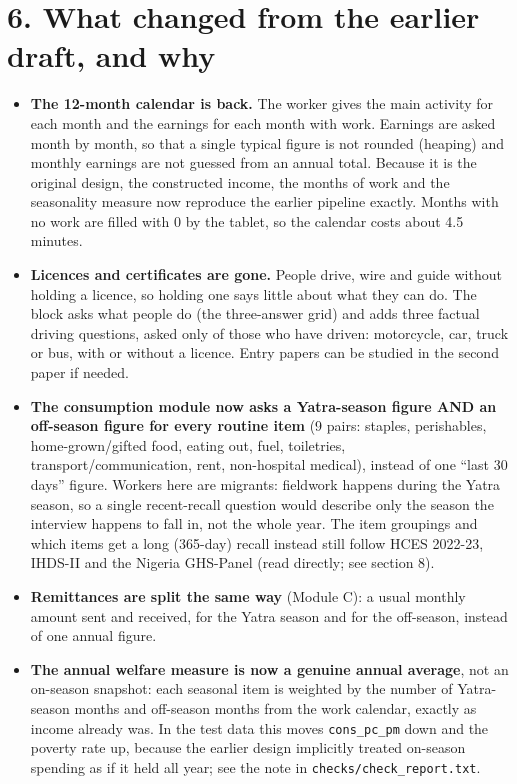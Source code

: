 \documentclass[10pt]{article}
\begin{document}
\section*{6. What changed from the earlier draft, and why}
\begin{itemize}[leftmargin=1.2em,itemsep=2pt]
\item \textbf{The 12-month calendar is back.} The worker gives the main activity for each month and the earnings for each month with work. Earnings are asked month by month, so that a single typical figure is not rounded (heaping) and monthly earnings are not guessed from an annual total.
Because it is the original design, the constructed income, the months of work and the seasonality measure now reproduce the earlier pipeline exactly. Months with no work are filled with 0 by the tablet, so the calendar costs about 4.5 minutes.
\item \textbf{Licences and certificates are gone.} People drive, wire and guide without holding a licence, so holding one says little about what they can do. The block asks what people do (the three-answer grid) and adds three factual driving questions, asked only of those who have driven: motorcycle, car, truck or bus, with or without a licence. Entry papers can be studied in the second paper if needed.
\item \textbf{The consumption module now asks a Yatra-season figure AND an off-season figure for every routine item} (9 pairs: staples, perishables, home-grown/gifted food, eating out, fuel, toiletries, transport/communication, rent, non-hospital medical), instead of one ``last 30 days'' figure. Workers here are migrants: fieldwork happens during the Yatra season, so a single recent-recall question would describe only the season the interview happens to fall in, not the whole year. The item groupings and which items get a long (365-day) recall instead still follow HCES 2022-23, IHDS-II and the Nigeria GHS-Panel (read directly; see section 8).
\item \textbf{Remittances are split the same way} (Module C): a usual monthly amount sent and received, for the Yatra season and for the off-season, instead of one annual figure.
\item \textbf{The annual welfare measure is now a genuine annual average}, not an on-season snapshot: each seasonal item is weighted by the number of Yatra-season months and off-season months from the work calendar, exactly as income already was. In the test data this moves \texttt{cons\_pc\_pm} down and the poverty rate up, because the earlier design implicitly treated on-season spending as if it held all year; see the note in \texttt{checks/check\_report.txt}.

\end{itemize}
\end{document}
